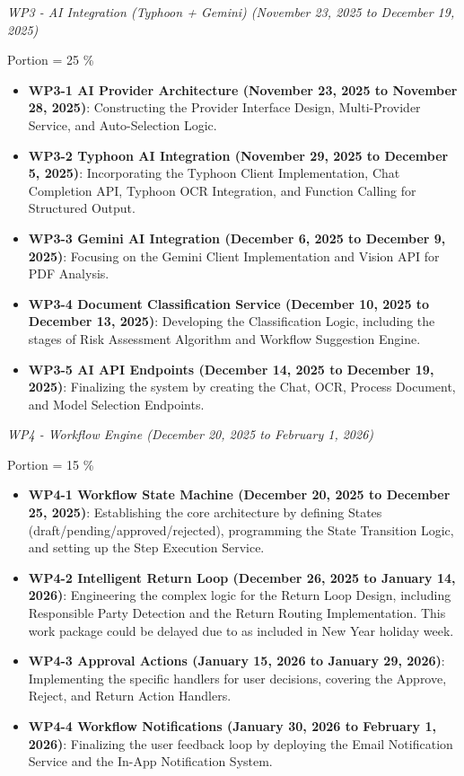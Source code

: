 \documentclass[12pt,oneside,openright,a4paper]{cpe-english-project}
\begin{document}
\vspace{1em}

\emph{WP3 - AI Integration (Typhoon + Gemini) (November 23, 2025 to December 19, 2025)}

Portion = 25 \%

\begin{itemize}
\item \textbf{WP3-1 AI Provider Architecture (November 23, 2025 to November 28, 2025)}: Constructing the Provider Interface Design, Multi-Provider Service, and Auto-Selection Logic.
\item \textbf{WP3-2 Typhoon AI Integration (November 29, 2025 to December 5, 2025)}: Incorporating the Typhoon Client Implementation, Chat Completion API, Typhoon OCR Integration, and Function Calling for Structured Output.
\item \textbf{WP3-3 Gemini AI Integration (December 6, 2025 to December 9, 2025)}: Focusing on the Gemini Client Implementation and Vision API for PDF Analysis.
\item \textbf{WP3-4 Document Classification Service (December 10, 2025 to December 13, 2025)}: Developing the Classification Logic, including the stages of Risk Assessment Algorithm and Workflow Suggestion Engine.
\item \textbf{WP3-5 AI API Endpoints (December 14, 2025 to December 19, 2025)}: Finalizing the system by creating the Chat, OCR, Process Document, and Model Selection Endpoints.
\end{itemize}

\vspace{1em}

\emph{WP4 - Workflow Engine (December 20, 2025 to February 1, 2026)}

Portion = 15 \%

\begin{itemize}
\item \textbf{WP4-1 Workflow State Machine (December 20, 2025 to December 25, 2025)}: Establishing the core architecture by defining States (draft/pending/approved/rejected), programming the State Transition Logic, and setting up the Step Execution Service.
\item \textbf{WP4-2 Intelligent Return Loop (December 26, 2025 to January 14, 2026)}: Engineering the complex logic for the Return Loop Design, including Responsible Party Detection and the Return Routing Implementation. This work package could be delayed due to as included in New Year holiday week.
\item \textbf{WP4-3 Approval Actions (January 15, 2026 to January 29, 2026)}: Implementing the specific handlers for user decisions, covering the Approve, Reject, and Return Action Handlers.
\item \textbf{WP4-4 Workflow Notifications (January 30, 2026 to February 1, 2026)}: Finalizing the user feedback loop by deploying the Email Notification Service and the In-App Notification System.
\end{itemize}
\end{document}
